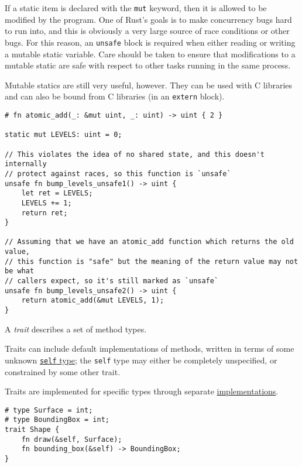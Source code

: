 \documentclass[]{article}
\begin{document}
If a static item is declared with the \texttt{mut} keyword, then it is
allowed to be modified by the program. One of Rust's goals is to make
concurrency bugs hard to run into, and this is obviously a very large
source of race conditions or other bugs. For this reason, an
\texttt{unsafe} block is required when either reading or writing a
mutable static variable. Care should be taken to ensure that
modifications to a mutable static are safe with respect to other tasks
running in the same process.

Mutable statics are still very useful, however. They can be used with C
libraries and can also be bound from C libraries (in an \texttt{extern}
block).

\begin{verbatim}
# fn atomic_add(_: &mut uint, _: uint) -> uint { 2 }

static mut LEVELS: uint = 0;

// This violates the idea of no shared state, and this doesn't internally
// protect against races, so this function is `unsafe`
unsafe fn bump_levels_unsafe1() -> uint {
    let ret = LEVELS;
    LEVELS += 1;
    return ret;
}

// Assuming that we have an atomic_add function which returns the old value,
// this function is "safe" but the meaning of the return value may not be what
// callers expect, so it's still marked as `unsafe`
unsafe fn bump_levels_unsafe2() -> uint {
    return atomic_add(&mut LEVELS, 1);
}
\end{verbatim}


A \emph{trait} describes a set of method types.

Traits can include default implementations of methods, written in terms
of some unknown \hyperref[self-types]{\texttt{self} type}; the
\texttt{self} type may either be completely unspecified, or constrained
by some other trait.

Traits are implemented for specific types through separate
\hyperref[implementations]{implementations}.

\begin{verbatim}
# type Surface = int;
# type BoundingBox = int;
trait Shape {
    fn draw(&self, Surface);
    fn bounding_box(&self) -> BoundingBox;
}
\end{verbatim}
\end{document}
